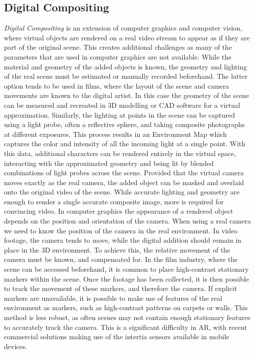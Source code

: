 \documentclass[ %
                    author={Gavin Parker},
                supervisor={Dr. Neill Campbell},
                    degree={MEng},
                     title={Deep Siamese Networks for Illumination Estimation from Stereo Images},
                  subtitle={},
                      type={research},
                      year={2018} ]{dissertation}
\begin{document}
\subsection{Digital Compositing}
\textit{Digital Compositing} is an extension of computer graphics and computer vision, where virtual objects are rendered on a real video stream to appear as if they are part of the original scene. This creates additional challenges as many of the parameters that are used in computer graphics are not available. While the material and geometry of the added objects is known, the geometry and lighting of the real scene must be estimated or manually recorded beforehand. The latter option tends to be used in films, where the layout of the scene and camera movements are known to the digital artist. In this case the geometry of the scene can be measured and recreated in 3D modelling or CAD software for a virtual approximation.
\newline
Similarly, the lighting at points in the scene can be captured using a light probe, often a reflective sphere, and taking composite photographs at different exposures. This process results in an Environment Map which captures the color and intensity of all the incoming light at a single point. With this data, additional characters can be rendered entirely in the virtual space, interacting with the approximated geometry and being lit by blended combinations of light probes across the scene. Provided that the virtual camera moves exactly as the real camera, the added object can be masked and overlaid onto the original video of the scene.
\newline
While accurate lighting and geometry are enough to render a single accurate composite image, more is required for convincing video.  In computer graphics the appearance of a rendered object depends on the position and orientation of the camera. When using a real camera we need to know the position of the camera in the real environment.  In video footage, the camera tends to move, while the digital addition should remain in place in the 3D environment. To achieve this, the relative movement of the camera must be known, and compensated for. In the film industry, where the scene can be accessed beforehand, it is common to place high-contrast stationary markers within the scene. Once the footage has been collected, it is then possible to track the movement of these markers, and therefore the camera. If explicit markers are unavailable, it is possible to make use of features of the real environment as markers, such as high-contrast patterns on carpets or walls. This method is less robust, as often scenes may not contain enough stationary features to accurately track the camera. This is a significant difficulty in AR, with recent commercial solutions making use of the intertia sensors available in mobile devices.
\newpage
\end{document}
